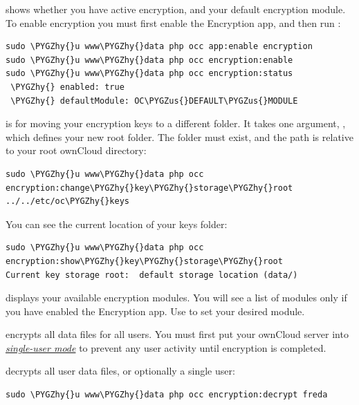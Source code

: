 \documentclass[letterpaper,10pt,english]{sphinxmanual}
\def\PYGZus{\char`\_}
\def\PYGZhy{\char`\-}
\begin{document}
 shows whether you have active encryption, and your default
encryption module. To enable encryption you must first enable the Encryption
app, and then run :

\begin{Verbatim}[commandchars=\\\{\}]
sudo \PYGZhy{}u www\PYGZhy{}data php occ app:enable encryption
sudo \PYGZhy{}u www\PYGZhy{}data php occ encryption:enable
sudo \PYGZhy{}u www\PYGZhy{}data php occ encryption:status
 \PYGZhy{} enabled: true
 \PYGZhy{} defaultModule: OC\PYGZus{}DEFAULT\PYGZus{}MODULE
\end{Verbatim}

 is for moving your encryption keys to a
different folder. It takes one argument, , which defines your new
root folder. The folder must exist, and the path is relative to your root ownCloud directory:

\begin{Verbatim}[commandchars=\\\{\}]
sudo \PYGZhy{}u www\PYGZhy{}data php occ encryption:change\PYGZhy{}key\PYGZhy{}storage\PYGZhy{}root ../../etc/oc\PYGZhy{}keys
\end{Verbatim}

You can see the current location of your keys folder:

\begin{Verbatim}[commandchars=\\\{\}]
sudo \PYGZhy{}u www\PYGZhy{}data php occ encryption:show\PYGZhy{}key\PYGZhy{}storage\PYGZhy{}root
Current key storage root:  default storage location (data/)
\end{Verbatim}

 displays your available encryption modules. You will
see a list of modules only if you have enabled the Encryption app. Use
 to set your desired module.

 encrypts all data files for all users. You must first
put your ownCloud server into {\hyperref[configuration_server/occ_command:maintenance\string-commands\string-label]{\emph{single-user
mode}}} to prevent any user activity until encryption
is completed.

 decrypts all user data files, or optionally a single
user:

\begin{Verbatim}[commandchars=\\\{\}]
sudo \PYGZhy{}u www\PYGZhy{}data php occ encryption:decrypt freda
\end{Verbatim}
\end{document}
